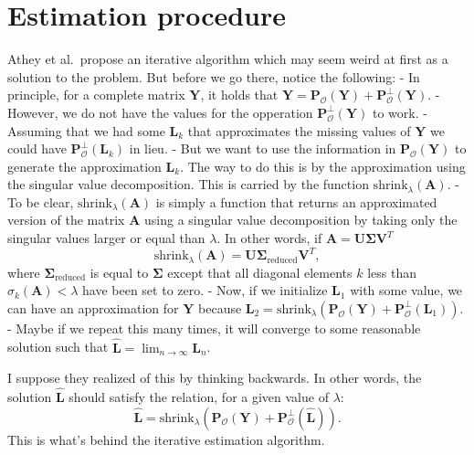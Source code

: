 \documentclass[11pt]{article}
\begin{document}
    \hypertarget{estimation-procedure}{%
\section{Estimation procedure}\label{estimation-procedure}}

    Athey et al.~propose an iterative algorithm which may seem weird at
first as a solution to the problem. But before we go there, notice the
following: - In principle, for a complete matrix \(\mathbf{Y}\), it
holds that
\(\mathbf{Y} = \mathbf{P}_{\mathcal{O}}(\mathbf{Y}) + \mathbf{P}_{\mathcal{O}}^{\bot}(\mathbf{Y})\).
- However, we do not have the values for the opperation
\(\mathbf{P}_{\mathcal{O}}^{\bot}(\mathbf{Y})\) to work. - Assuming that
we had some \(\mathbf{L}_k\) that approximates the missing values of
\(\mathbf{Y}\) we could have
\(\mathbf{P}_{\mathcal{O}}^{\bot}(\mathbf{L}_k)\) in lieu. - But we want
to use the information in \(\mathbf{P}_{\mathcal{O}}(\mathbf{Y})\) to
generate the approximation \(\mathbf{L}_k\). The way to do this is by
the approximation using the singular value decomposition. This is
carried by the function \(\mathrm{shrink}_\lambda(\mathbf{A})\). - To be
clear, \(\mathrm{shrink}_\lambda(\mathbf{A})\) is simply a function that
returns an approximated version of the matrix \(\mathbf{A}\) using a
singular value decomposition by taking only the singular values larger
or equal than \(\lambda\). In other words, if
\(\mathbf{A}=\mathbf{U}\boldsymbol{\Sigma}\mathbf{V}^T\) \[
\mathrm{shrink}_\lambda(\mathbf{A}) = \mathbf{U}\boldsymbol{\Sigma}_{\mathrm{reduced}}\mathbf{V}^T,
\] where \(\boldsymbol{\Sigma}_{\mathrm{reduced}}\) is equal to
\(\boldsymbol{\Sigma}\) except that all diagonal elements \(k\) less
than \(\sigma_k(\mathbf{A})<\lambda\) have been set to zero. - Now, if
we initialize \(\mathbf{L}_1\) with some value, we can have an
approximation for \(\mathbf{Y}\) because
\(\mathbf{L}_2 = \mathrm{shrink}_\lambda(\mathbf{P}_{\mathcal{O}}(\mathbf{Y}) + \mathbf{P}_{\mathcal{O}}^{\bot}(\mathbf{L}_1))\).
- Maybe if we repeat this many times, it will converge to some
reasonable solution such that
\(\widehat{\mathbf{L}}=\lim_{n\rightarrow\infty}\mathbf{L}_n\).

I suppose they realized of this by thinking backwards. In other words,
the solution \(\widehat{\mathbf{L}}\) should satisfy the relation, for a
given value of \(\lambda\):
\[\widehat{\mathbf{L}} = \mathrm{shrink}_\lambda(\mathbf{P}_{\mathcal{O}}(\mathbf{Y}) + \mathbf{P}_{\mathcal{O}}^{\bot}(\widehat{\mathbf{L}})).\]
This is what's behind the iterative estimation algorithm.
\end{document}
